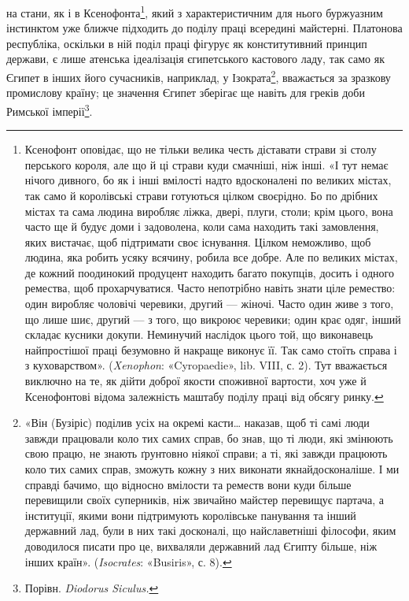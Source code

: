 на стани, як і в Ксенофонта\footnote{
Ксенофонт оповідає, що не тільки велика честь діставати страви
зі столу перського короля, але що й ці страви куди смачніші, ніж інші.
«І тут немає нічого дивного, бо як і інші вмілості надто вдосконалені по
великих містах, так само й королівські страви готуються цілком своєрідно.
Бо по дрібних містах та сама людина виробляє ліжка, двері, плуги, столи;
крім цього, вона часто ще й будує доми і задоволена, коли сама находить
такі замовлення, яких вистачає, щоб підтримати своє існування.
Цілком неможливо, щоб людина, яка робить усяку всячину, робила
все добре. Але по великих містах, де кожний поодинокий продуцент
находить багато покупців, досить і одного ремества, щоб прохарчуватися.
Часто непотрібно навіть знати ціле ремество: один виробляє чоловічі
черевики, другий — жіночі. Часто один живе з того, що лише шиє, другий
— з того, що викроює черевики; один крає одяг, інший складає кусники
докупи. Неминучий наслідок цього той, що виконавець найпростішої
праці безумовно й накраще виконує її. Так само стоїть справа і
з куховарством». (\emph{Xenophon}: «Cyropaedie», lib. VIII, с. 2). Тут вважається
виключно на те, як дійти доброї якости споживної вартости,
хоч уже й Ксенофонтові відома залежність маштабу поділу праці від
обсягу ринку.
}, який з характеристичним для
нього буржуазним інстинктом уже ближче підходить до поділу
праці всередині майстерні. Платонова республіка, оскільки в ній
поділ праці фігурує як конститутивний принцип держави, є
лише атенська ідеалізація єгипетського кастового ладу, так само
як Єгипет в інших його сучасників, наприклад, у Ізократа\footnote{
«Він (Бузіріс) поділив усіх на окремі касти\dots{} наказав, щоб ті
самі люди завжди працювали коло тих самих справ, бо знав, що ті люди,
які змінюють свою працю, не знають ґрунтовно ніякої справи; а ті, які
завжди працюють коло тих самих справ, зможуть кожну з них виконати
якнайдосконаліше. І ми справді бачимо, що відносно вмілости та реместв
вони куди більше перевищили своїх суперників, ніж звичайно майстер
перевищує партача, а інституції, якими вони підтримують королівське
панування та інший державний лад, були в них такі досконалі, що найславетніші
філософи, яким доводилося писати про це, вихваляли державний
лад Єгипту більше, ніж інших країн». (\emph{Isocrates}: «Busiris», с. 8).
},
вважається за зразкову промислову країну; це значення Єгипет
зберігає ще навіть для греків доби Римської імперії\footnote{
Порівн. \emph{Diodorus Siculus.}
}.

